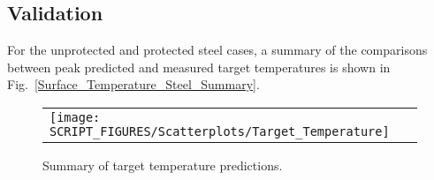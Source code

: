 \clearpage


\subsection*{Validation}

For the unprotected and protected steel cases, a summary of the comparisons between peak predicted and measured target temperatures is shown in Fig.~\ref{Surface_Temperature_Steel_Summary}.

\begin{figure}[!ht]
\begin{center}
\begin{tabular}{l}
\texttt{[image: SCRIPT\_FIGURES/Scatterplots/Target\_Temperature]}
\end{tabular}
\end{center}
\caption[Summary of target temperature predictions]
{Summary of target temperature predictions.}
\label{Target Temperature}
\end{figure}

